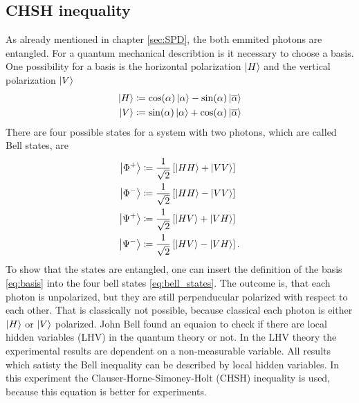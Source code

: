 \subsection{CHSH inequality}\label{sec:theory_CHSH}
As already mentioned in chapter \ref{sec:SPD}, the both emmited photons are entangled. For a quantum mechanical describtion is it necessary to choose a basis. One possibility for a basis is the horizontal polarization $\ket{H}$ and  the vertical polarization $\ket{V}$
\begin{subequations}
\label{eq:basis}
\begin{align}
\ket{H}  & \coloneqq \mathrm{cos}(\alpha) \ket{\alpha} -  \mathrm{sin}(\alpha) \ket{\overline{\alpha}}
\label{eq:basis:H}\\
\ket{V}  & \coloneqq \mathrm{sin}(\alpha) \ket{\alpha} +  \mathrm{cos}(\alpha) \ket{\overline{\alpha}}
\label{eq:basis:V}
\end{align}
\end{subequations}
There are four possible states for a system with two photons, which are called Bell states, are
\begin{subequations}
\label{eq:bell_states}
\begin{align}
\ket{\Phi^{+}} & \coloneqq \frac{1}{\sqrt{2}} \left[\ket{HH} + \ket{VV} \right]  
\label{eq:bell_states:phip}\\  
\ket{\Phi^{-}} & \coloneqq \frac{1}{\sqrt{2}} \left[\ket{HH} - \ket{VV} \right]  
\label{eq:bell_states:phim}\\
\ket{\Psi^{+}} & \coloneqq \frac{1}{\sqrt{2}} \left[\ket{HV} + \ket{VH} \right] 
\label{eq:bell_states:psip}\\  
\ket{\Psi^{-}} & \coloneqq \frac{1}{\sqrt{2}} \left[\ket{HV} - \ket{VH} \right].
\label{eq:bell_states:psim}
\end{align}
\end{subequations}
To show that the states are entangled, one can insert the definition of the basis \eqref{eq:basis} into the four bell states \eqref{eq:bell_states}. The outcome is, that each photon is unpolarized, but they are still perpenducular polarized with respect to each other. 
That is classically not possible, because classical each photon is either $\ket{H}$  or $\ket{V}$ polarized. 
John Bell found an equaion to check if there are local hidden variables (LHV) in the quantum theory or not.  In the LHV theory the experimental results are dependent on a non-measurable variable.  All results which satisty the Bell inequality can be described by local hidden variables. In this experiment the Clauser-Horne-Simoney-Holt (CHSH) inequality is used, because this equation is better for experiments. 
